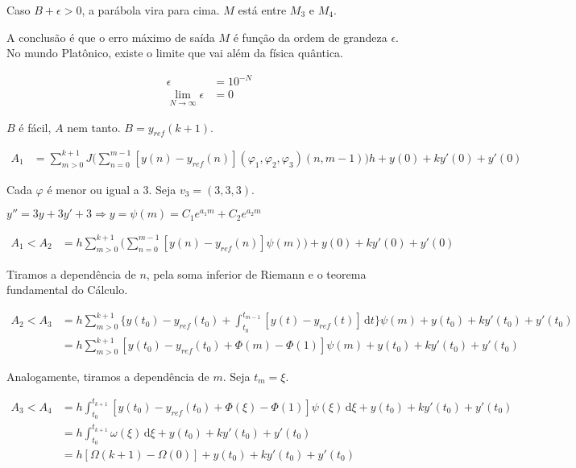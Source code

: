 \documentclass[12pt]{article}
\begin{document}
Caso $B + \epsilon > 0$, a par\'abola vira para cima. $M$ est\'a entre $M_3$ e $M_4$.

A conclus\~ao \'e que o erro m\'aximo de sa\'ida $M$ \'e fun\c{c}\~ao da ordem de grandeza $\epsilon$. No mundo Plat\^onico, existe o limite que vai al\'em da f\'isica qu\^antica.

\begin{align}
 \epsilon &= 10^{-N} \\
 \lim_{N \to \infty} \epsilon &= 0
\end{align}

$B$ \'e f\'acil, $A$ nem tanto. $B = y_{ref}(k+1)$.

\begin{align}
 A_1 &= \sum_{m > 0}^{k+1} J\bigg( \sum_{n = 0}^{m - 1} [y(n) - y_{ref}(n)] (\varphi_1, \varphi_2, \varphi_3) (n, m-1) \bigg) h + y(0) + k y'(0) + y'(0)
\end{align}

Cada $\varphi$ \'e menor ou igual a $3$. Seja $v_3 = (3,3,3)$.

$y'' = 3y + 3y' + 3 \Rightarrow y = \psi(m) = C_1 e^{a_1 m} + C_2 e^{a_2 m}$

\begin{align}
 A_1 < A_2 &= h \sum_{m > 0}^{k+1} \bigg( \sum_{n = 0}^{m - 1} [y(n) - y_{ref}(n)] \psi(m)   \bigg) + y(0) + k y'(0) + y'(0)
\end{align}

Tiramos a depend\^encia de $n$, pela soma inferior de Riemann e o teorema fundamental do C\'alculo.

\begin{align}
 A_2 < A_3 &= h \sum_{m > 0}^{k+1} \bigg\{ y(t_0) - y_{ref}(t_0) + \int_{t_0}^{t_{m - 1}} [y(t) - y_{ref}(t)]\,\mathrm{d}t \bigg\} \psi(m) + y(t_0) + k y'(t_0) + y'(t_0) \\
 &= h \sum_{m > 0}^{k+1} [ y(t_0) - y_{ref}(t_0) + \Phi(m) - \Phi(1) ] \psi(m) + y(t_0) + k y'(t_0) + y'(t_0)
\end{align}

Analogamente, tiramos a depend\^encia de $m$. Seja $t_m = \xi$.

\begin{align}
 A_3 < A_4 &= h \int_{t_0}^{t_{k+1}} [ y(t_0) - y_{ref}(t_0) + \Phi(\xi) - \Phi(1) ] \psi(\xi)\,\mathrm{d}\xi + y(t_0) + k y'(t_0) + y'(t_0) \\
 &= h \int_{t_0}^{t_{k+1}}  \omega(\xi) \,\mathrm{d}\xi + y(t_0) + k y'(t_0) + y'(t_0) \\
 &= h [\Omega(k+1) - \Omega(0)] + y(t_0) + k y'(t_0) + y'(t_0)
\end{align}
\end{document}
